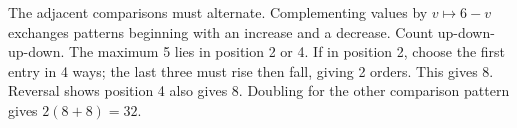 The adjacent comparisons must alternate. Complementing values by $v\mapsto6-v$ exchanges patterns beginning with an increase and a decrease. Count up-down-up-down. The maximum 5 lies in position 2 or 4. If in position 2, choose the first entry in 4 ways; the last three must rise then fall, giving 2 orders. This gives 8. Reversal shows position 4 also gives 8. Doubling for the other comparison pattern gives $2(8+8)=\boxed{32}$.
